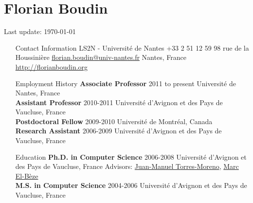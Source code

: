 \documentclass[11pt,a4paper]{article}
\begin{document}
\section*{Florian Boudin}

Last update: \today

\hrulefill

\begin{itemize}
[labelindent=!,
labelsep*=.5cm,
leftmargin=3.1cm,
itemsep=0.3cm,
align=left,
style=multiline,
font=\normalfont\scshape]

\item[Contact Information]
LS2N - Université de Nantes  \hfill +33 2 51 12 59 98  rue de la Houssinière \hfill \url{florian.boudin@univ-nantes.fr}  Nantes, France \hfill \url{http://florianboudin.org}

\item[Employment History]
\textbf{Associate Professor} \hfill 2011 to present \newline
Université de Nantes, France \\[-.5cm]

\textbf{Assistant Professor} \hfill 2010-2011 \newline
Université d'Avignon et des Pays de Vaucluse, France \\[-.5cm]

\textbf{Postdoctoral Fellow} \hfill 2009-2010 \newline
Université de Montréal, Canada \\[-.5cm]
                                       
\textbf{Research Assistant} \hfill 2006-2009 \newline
Université d'Avignon et des Pays de Vaucluse, France

\item[Education]
\textbf{Ph.D. in Computer Science} \hfill 2006-2008 \newline 
Université d'Avignon et des Pays de Vaucluse, France \newline
Advisors: 
\href{http://lia.univ-avignon.fr/chercheurs/torres/}{Juan-Manuel Torres-Moreno},
\href{http://lia.univ-avignon.fr/user/48}{Marc El-Bèze} \\[-.5cm]

\textbf{M.S. in Computer Science} \hfill 2004-2006 \newline 
Université d'Avignon et des Pays de Vaucluse, France \\[-.5cm]
                    

\end{itemize}
\end{document}
